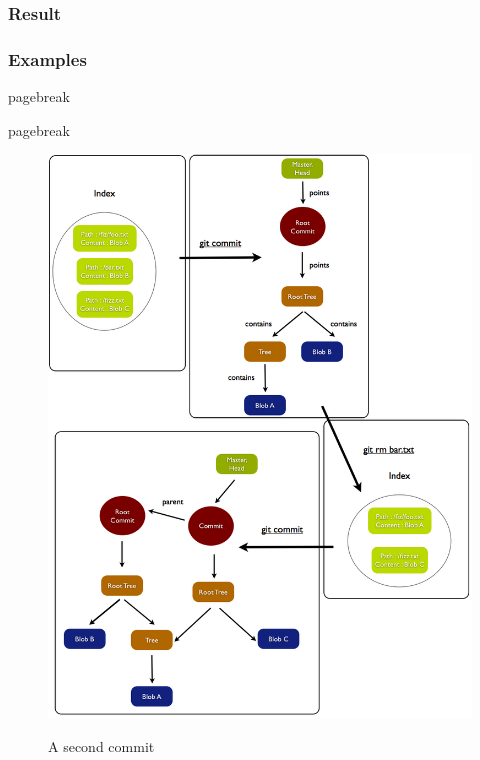\subsubsection{Result}

\subsubsection{Examples}


pagebreak
\pagebreak


pagebreak
\pagebreak



\begin{figure}[h] 
	\caption{A second commit}
	\centering
	\includegraphics[scale=0.4]{images/commit2.png}
	\label{fig:commit2}
\end{figure}

